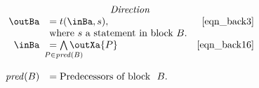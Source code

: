 \begin{math}
\begin{array}{rlr}
    \multicolumn{3}{c}{\emph{Direction}} \\

    \outBa &= t(\inBa, s), \labeleq{eqn_back3} & \eqref{eqn_back3} \\
    & \text{where $s$ a statement in block\ } B.\\
    \inBa &= \bigwedge\limits_{\mathclap{P \in \mathit{pred}(B)}} \outXa{P} \labeleq{eqn_back16} & \eqref{eqn_back16} \\\\ 
    \mfun{pred}(B) &= \text{Predecessors of block }\ B.
  \end{array}
\end{math}
